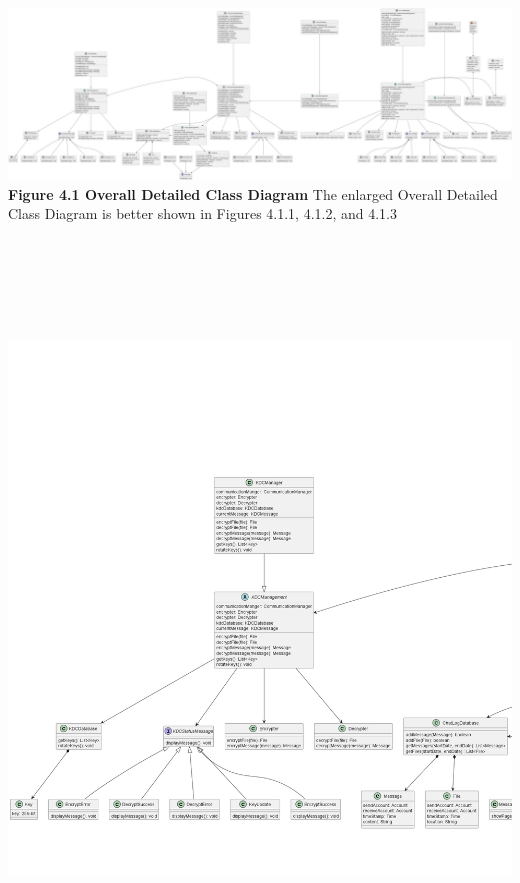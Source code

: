 \documentclass[]{article}
\begin{document}
\begin{center}
	\includegraphics[width=\textwidth]{../images/ClassDiagram/FullClass.png}
	\textbf{Figure 4.1 Overall Detailed Class Diagram}
	\newline The enlarged Overall Detailed Class Diagram is better shown in Figures 4.1.1, 4.1.2, and 4.1.3
	\includegraphics[width=\textwidth,height=8in]{../images/ClassDiagram/left.png}

\end{center}
\end{document}
